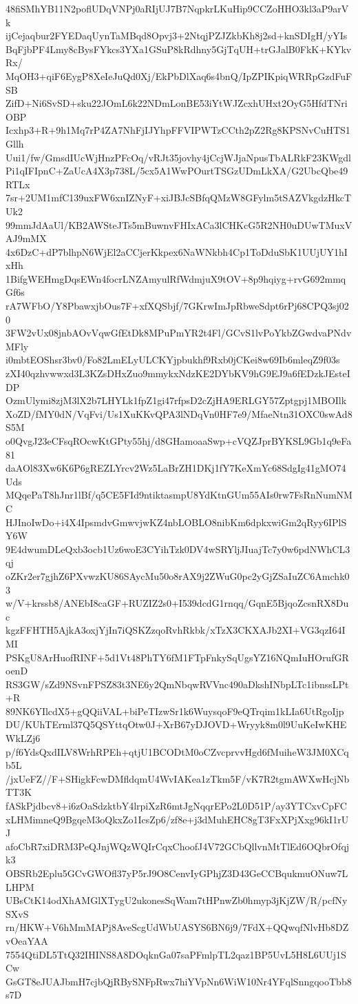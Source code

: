 48fiSMhYB11N2poflUDqVNPj0aRIjUJ7B7NqpkrLKuHip9CCZoHHO3kl3aP9arVk
ijCejaqbur2FYEDaqUynTaMBqd8Opvj3+2NtqjPZJZkbKh8j2sd+knSDIgH/yYIs
BqFjbPF4Lmy8cBysFYkcs3YXa1GSuP8kRdhny5GjTqUH+trGJalB0FkK+KYkvRx/
MqOH3+qiF6EygP8XeIeJuQd0Xj/EkPbDlXaq6s4bnQ/IpZPIKpiqWRRpGzdFuFSB
ZifD+Ni6SvSD+sku22JOmL6k22NDmLonBE53iYtWJZcxhUHxt2OyG5HfdTNriOBP
Icxhp3+R+9h1Mq7rP4ZA7NhFjIJYhpFFVIPWTzCCth2pZ2Rg8KPSNvCuHTS1Gllh
Uui1/fw/GmsdIUcWjHnzPFcOq/vRJt35jovhy4jCcjWJjaNpusTbALRkF23KWgdl
Pi1qIFIpnC+ZaUcA4X3p738L/5cx5A1WwPOurtTSGzUDmLkXA/G2UbcQbe49RTLx
7sr+2UM1mfC139uxFW6xnIZNyF+xiJBJcSBfqQMzW8GFylm5tSAZVkgdzHkcTUk2
99mmJdAaUl/KB2AWSteJTs5mBuwnvFHIxACa3lCHKcG5R2NH0uDUwTMuxVAJ9mMX
4x6DzC+dP7blhpN6WjEl2aCCjerKkpex6NaWNkbh4Cp1ToDduSbK1UUjUY1hIxHh
1BifgWEHmgDqsEWn4focrLNZAmyulRfWdmjuX9tOV+8p9hqiyg+rvG692mmqGf6s
rA7WFbO/Y8PbawxjbOus7F+xfXQSbjf/7GKrwImJpRbweSdpt6rPj68CPQ3sj020
3FW2vUx08jnbAOvVqwGfEtDk8MPuPmYR2t4Fl/GCvS1lvPoYkbZGwdvaPNdvMFly
i0mbtEOShsr3bv0/Fo82LmELyULCKYjpbukhf9Rxb0jCKei8w69Ib6mleqZ9f03s
zXI40qzhvwwxd3L3KZsDHxZuo9mmykxNdzKE2DYbKV9hG9EJ9a6fEDzkJEsteIDP
OzmUlymi8zjM3lX2b7LHYLk1fpZ1gi47rfpsD2cZjHA9ERLGY57Zptgpj1MBOIlk
XoZD/fMY0dN/VqFvi/Us1XuKKvQPA3lNDqVn0HF7e9/MfaeNtn31OXC0swAd8S5M
o0QvgJ23eCFsqROcwKtGPty55hj/d8GHamoaaSwp+cVQZJprBYKSL9Gb1q9eFa81
daAOl83Xw6K6P6gREZLYrcv2Wz5LaBrZH1DKj1fY7KeXmYc68SdgIg41gMO74Uds
MQqePaT8hJnr1lBf/q5CE5FId9ntiktasmpU8YdKtnGUm55AIs0rw7FsRnNumNMC
HJInoIwDo+i4X4IpsmdvGmwvjwKZ4nbLOBLO8nibKm6dpkxwiGm2qRyy6IPlSY6W
9E4dwumDLeQxb3ocb1Uz6woE3CYihTzk0DV4wSRYljJIuajTc7y0w6pdNWhCL3qj
oZKr2er7gjhZ6PXvwzKU86SAycMu50o8rAX9j2ZWuG0pc2yGjZSaIuZC6Amchk03
w/V+krssb8/ANEbI8caGF+RUZIZ2s0+I539dcdG1rnqq/GqnE5BjqoZcsnRX8Duc
kgzFFHTH5AjkA3oxjYjIn7iQSKZzqoRvhRkbk/xTzX3CKXAJb2XI+VG3qzI64IMI
PSKgU8ArHuofRINF+5d1Vt48PhTY6fM1FTpFnkySqUgsYZ16NQmIuHOrufGRoenD
RS3GW/sZd9NSvnFPSZ83t3NE6y2QmNbqwRVVnc490aDkshINbpLTc1ibnssLPt+R
89NK6YIlcdX5+gQQiiVAL+biPeTIzwSr1k6WuysqoF9eQTrqim1kLIa6UtRgoIjp
DU/KUhTErml37Q5QSYttqOtw0J+XrB67yDJOVD+Wryyk8m0l9UuKeIwKHEWkLZj6
p/f6YdsQxdILV8WrhRPEh+qtjU1BCODtM0oCZvcprvvHgd6fMuiheW3JM0XCqb5L
/jxUeFZ//F+SHigkFcwDMfldqmU4WvIAKea1zTkm5F/vK7R2tgmAWXwHcjNbTT3K
fASkPjdbcv8+i6zOaSdzktbY4lrpiXzR6mtJgNqqrEPo2L0D51P/ay3YTCxvCpFC
xLHMimneQ9BgqeM3oQkxZo1IcsZp6/zf8e+j3dMuhEHC8gT3FxXPjXxg96kI1rUJ
afoCbR7xiDRM3PeQJnjWQzWQIrCqxChoofJ4V72GCbQllvnMtTlEd6OQbrOfqjk3
OBSRb2Eplu5GCvGWOfl37yP5rJ9O8CenvIyGPhjZ3D43GeCCBqukmuONuw7LLHPM
UBsCtK14odXhAMGlXTygU2ukonesSqWam7tHPnwZb0hmyp3jKjZW/R/pcfNySXvS
rn/HKW+V6hMmMAPj8AveScgUdWbUASYS6BN6j9/7FdX+QQwqfNlvHb8DZvOeaYAA
7554QtiDL5TtQ32IHINS8A8DOqknGa07saPFmlpTL2qaz1BP5UvL5H8L6UUj1SCw
GsGT8eJUAJbmH7cjbQjRBySNFpRwx7hiYVpNn6WiW10Nr4YFqlSnngqooTbb8s7D
